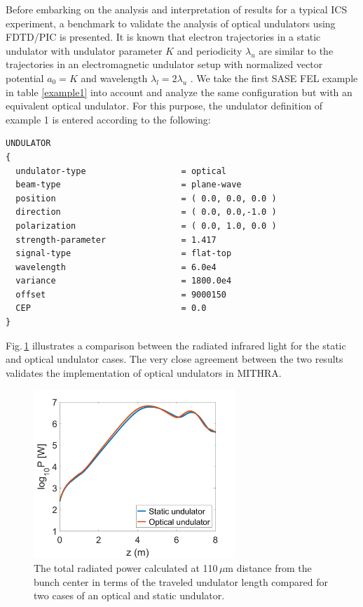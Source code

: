 Before embarking on the analysis and interpretation of results for a typical ICS experiment, a benchmark to validate the analysis of optical undulators using FDTD/PIC is presented.
%
It is known that electron trajectories in a static undulator with undulator parameter $K$ and periodicity $\lambda_u$ are similar to the trajectories in an electromagnetic undulator setup with normalized vector potential $a_0=K$ and wavelength $\lambda_l=2\lambda_u$ \cite{esarey1993nonlinear}.
%
We take the first SASE FEL example in table \ref{example1} into account and analyze the same configuration but with an equivalent optical undulator.
%
For this purpose, the undulator definition of example 1 is entered according to the following:
%
\begin{snugshade}
\begin{Verbatim}[fontsize=\small, tabsize = 4]
UNDULATOR
{
  undulator-type                   = optical
  beam-type                        = plane-wave
  position                         = ( 0.0, 0.0, 0.0 )
  direction                        = ( 0.0, 0.0,-1.0 )
  polarization                     = ( 0.0, 1.0, 0.0 )
  strength-parameter               = 1.417
  signal-type                      = flat-top
  wavelength                       = 6.0e4
  variance                         = 1800.0e4
  offset                           = 9000150
  CEP                              = 0.0
}
\end{Verbatim}
\end{snugshade}
%
Fig.\,\ref{ICS-benchmark} illustrates a comparison between the radiated infrared light for the static and optical undulator cases.
%
The very close agreement between the two results validates the implementation of optical undulators in MITHRA.
%
\begin{figure}
\centering
\includegraphics[height=2.5in]{./MITHRA_EXAMPLES/Fig7/Fig7.pdf}
\caption{The total radiated power calculated at 110\,$\mu$m distance from the bunch center in terms of the traveled undulator length compared for two cases of an optical and static undulator.}
\label{ICS-benchmark}
\end{figure}

